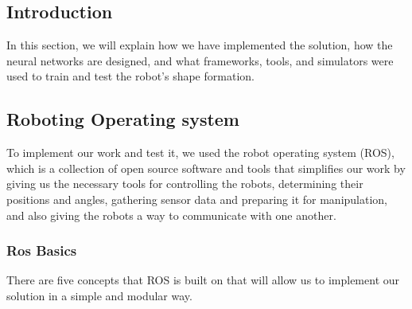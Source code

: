 \documentclass[12pt]{extarticle}
\begin{document}
\pagebreak




\subsection{Introduction}
In this section, we will explain how we have implemented the solution, how the neural networks are designed, and what frameworks, tools, and simulators were used to train and test the robot's shape formation.











\subsection{Roboting Operating system}
To implement our work and test it, we used the robot operating system (ROS), which is a collection of open source software and tools that simplifies our work by giving us the necessary tools for controlling the robots, determining their positions and angles, gathering sensor data and preparing it for manipulation, and also giving the robots a way to communicate with one another.
\subsubsection{Ros Basics}
There are five concepts that ROS is built on that will allow us to implement our solution in a simple and modular way.


 
\end{document}
